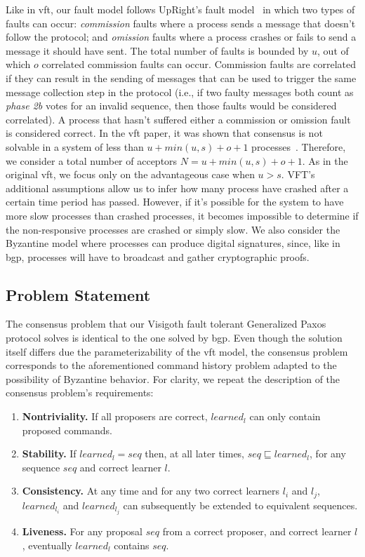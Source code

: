 Like in \acrshort{vft}, our fault model follows UpRight's fault model~\cite{Clement:2009} in which two types of faults can occur: \textit{commission} faults where a process sends a message that doesn't follow the protocol; and \textit{omission} faults where a process crashes or fails to send a message it should have sent. The total number of faults is bounded by $u$, out of which $o$ correlated commission faults can occur. Commission faults are correlated if they can result in the sending of messages that can be used to trigger the same message collection step in the protocol {\color{red}(i.e., if two faulty messages both count as \textit{phase 2b} votes for an invalid sequence, then those faults would be considered correlated)}. A process that hasn't suffered either a commission or omission fault is considered correct. In the \acrshort{vft} paper, it was shown that consensus is not solvable in a system of less than $u+min(u,s)+o+1$ processes~\cite{Porto2015}. Therefore, we consider a total number of acceptors $N = u + min(u,s)+o+1$. As in the original \acrshort{vft}, we focus only on the advantageous case when $u>s$. VFT's additional assumptions allow us to infer how many process have crashed after a certain time period has passed. However, if it's possible for the system to have more slow processes than crashed processes, it becomes impossible to determine if the non-responsive processes are crashed or simply slow.	We also consider the Byzantine model where processes can produce digital signatures, since, like in \acrshort{bgp}, processes will have to broadcast and gather cryptographic proofs.

\subsection{Problem Statement}
The consensus problem that our Visigoth fault tolerant Generalized Paxos protocol solves is identical to the one solved by \acrshort{bgp}. Even though the solution itself differs due the parameterizability of the \acrshort{vft} model, the consensus problem corresponds to the aforementioned command history problem adapted to the possibility of Byzantine behavior. For clarity, we repeat the description of the consensus problem's requirements:

\begin{enumerate}
	\item \textbf{Nontriviality.} If all proposers are correct, $learned_l$ can only contain proposed commands.
	\item \textbf{Stability.} If $learned_l = seq$ then, at all later times, $seq \sqsubseteq learned_l$, for any sequence $seq$ and correct learner $l$.
	\item \textbf{Consistency.} At any time and for any two correct learners $l_i$ and $l_j$, $learned_{l_i}$ and $learned_{l_j}$ can subsequently be extended to equivalent sequences.
	\item \textbf{Liveness.} For any proposal $seq$ from a correct proposer, and correct learner $l$, eventually $learned_l$ contains $seq$.
\end{enumerate}